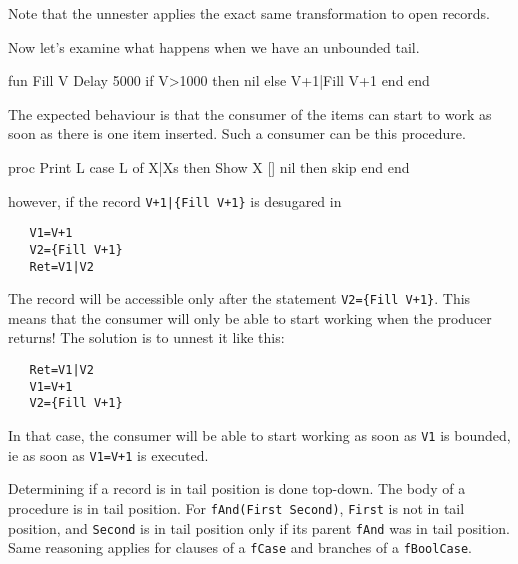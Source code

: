 \documentclass[a4paper]{memoir}
\begin{document}
Note that the unnester applies the exact same transformation to open records.

Now let's examine what happens when we have an unbounded tail.

   fun {Fill V}
      {Delay 5000} %
      if V>1000 then
	      nil
      else
         V+1|{Fill V+1}
      end
   end

The expected behaviour is that the consumer of the items can start to work as
soon as there is one item inserted. Such a consumer can be this procedure.

   proc {Print L}
      case L
      of X|Xs then
         {Show X}
      [] nil then
         skip
      end
   end

however, if the record \lstinline!V+1|{Fill V+1}! is desugared in 
\begin{lstlisting}
   V1=V+1
   V2={Fill V+1}
   Ret=V1|V2
\end{lstlisting}
The record will be accessible only after the statement 
\lstinline!V2={Fill V+1}!. This means that the consumer will only be able to start working when the
producer returns!
The solution is to unnest it like this:
\begin{lstlisting}
   Ret=V1|V2
   V1=V+1
   V2={Fill V+1}
\end{lstlisting}
In that case, the consumer will be able to start working as soon as
\lstinline!V1! is bounded, ie as soon as \lstinline!V1=V+1! is executed.

Determining if a record is in tail position is done top-down.
The body of a procedure is in tail position. For \lstinline!fAnd(First Second)!,
\lstinline!First! is not in tail position, and \lstinline!Second! is in tail
position only if its parent \lstinline!fAnd! was in tail position.
Same reasoning applies for clauses of a \lstinline!fCase! and branches of a
\lstinline!fBoolCase!.
\end{document}
